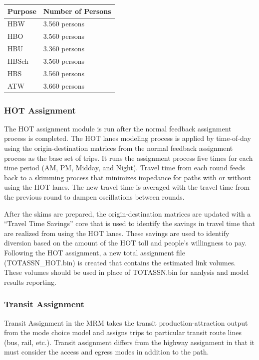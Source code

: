 \documentclass[
]{article}
\begin{document}
\begingroup\fontsize{14}{16}\selectfont

\begin{longtabu} to 
\toprule
Purpose & Number of Persons\\
\midrule
HBW & 3.560 persons\\
HBO & 3.560 persons\\
HBU & 3.360 persons\\
HBSch & 3.560 persons\\
HBS & 3.560 persons\\
\addlinespace
ATW & 3.660 persons\\
\bottomrule
\end{longtabu}
\endgroup{}

\subsubsection{HOT Assignment}\label{hot-assignment}

The HOT assignment module is run after the normal feedback assignment
process is completed. The HOT lanes modeling process is applied by
time-of-day using the origin-destination matrices from the normal
feedback assignment process as the base set of trips. It runs the
assignment process five times for each time period (AM, PM, Midday, and
Night). Travel time from each round feeds back to a skimming process
that minimizes impedance for paths with or without using the HOT lanes.
The new travel time is averaged with the travel time from the previous
round to dampen oscillations between rounds.

After the skims are prepared, the origin-destination matrices are
updated with a ``Travel Time Savings'' core that is used to identify the
savings in travel time that are realized from using the HOT lanes. These
savings are used to identify diversion based on the amount of the HOT
toll and people's willingness to pay. Following the HOT assignment, a
new total assignment file (TOTASSN\_HOT.bin) is created that contains
the estimated link volumes. These volumes should be used in place of
TOTASSN.bin for analysis and model results reporting.

\subsubsection{Transit Assignment}\label{transit-assignment}

Transit Assignment in the MRM takes the transit production-attraction
output from the mode choice model and assigns trips to particular
transit route lines (bus, rail, etc.). Transit assignment differs from
the highway assignment in that it must consider the access and egress
modes in addition to the path.
\end{document}
